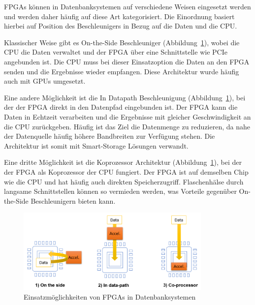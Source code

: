 \documentclass[conference]{IEEEtran}
\begin{document}
FPGAs können in Datenbanksystemen auf verschiedene Weisen eingesetzt werden und werden daher häufig auf diese Art kategorisiert. Die Einordnung basiert hierbei auf Position des Beschleunigers
in Bezug auf die Daten und die CPU\@.


Klassischer Weise gibt es On-the-Side Beschleuniger (Abbildung~\ref{fig:deployment}), wobei die CPU die Daten
verwaltet und der FPGA über eine Schnittstelle wie PCIe angebunden ist. Die CPU muss bei dieser Einsatzoption die Daten an den FPGA senden und die Ergebnisse wieder
empfangen. Diese Architektur wurde häufig auch mit GPUs umgesetzt.

Eine andere Möglichkeit ist die In Datapath Beschleunigung (Abbildung~\ref{fig:deployment}), bei der der FPGA direkt in den Datenpfad eingebunden ist. Der FPGA kann die Daten in Echtzeit
verarbeiten und die Ergebnisse mit gleicher Geschwindigkeit an die CPU zurückgeben. Häufig ist das Ziel die Datenmenge zu reduzieren, da nahe der
Datenquelle häufig höhere Bandbreiten zur Verfügung stehen. Die Architektur ist somit mit Smart-Storage Lösungen verwandt.

Eine dritte Möglichkeit ist die Koprozessor Architektur (Abbildung~\ref{fig:deployment}), bei der der FPGA als Koprozessor der CPU fungiert. Der FPGA ist auf demselben Chip wie die CPU
und hat häufig auch direkten Speicherzugriff. Flaschenhälse durch langsame Schnittstellen können so vermieden werden, was Vorteile gegenüber
\mbox{On-the-Side} Beschleunigern bieten kann.

\begin{figure}[] %
    \centering
    \includegraphics[width=0.85\textwidth]{imgs/deployment.png}
    \caption{Einsatzmöglichkeiten von FPGAs in Datenbanksystemen~\cite{istvan_glass_2019}}
    \label{fig:deployment}
\end{figure}




\end{document}
